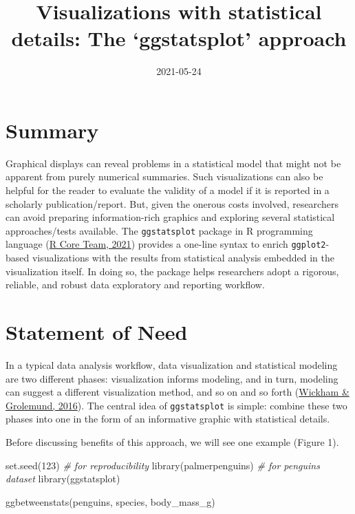 \documentclass[
]{article}
\title{Visualizations with statistical details: The `ggstatsplot'
approach}
\author{}
\date{\vspace{-2.5em}2021-05-24}
\newenvironment{Shaded}{\begin{snugshade}}{\end{snugshade}}
\newcommand{\CommentTok}[1]{\textcolor[rgb]{0.56,0.35,0.01}{\textit{#1}}}
\newcommand{\DecValTok}[1]{\textcolor[rgb]{0.00,0.00,0.81}{#1}}
\newcommand{\FunctionTok}[1]{\textcolor[rgb]{0.00,0.00,0.00}{#1}}
\newcommand{\NormalTok}[1]{#1}
\begin{document}
\maketitle

\hypertarget{summary}{%
\section{Summary}\label{summary}}

Graphical displays can reveal problems in a statistical model that might
not be apparent from purely numerical summaries. Such visualizations can
also be helpful for the reader to evaluate the validity of a model if it
is reported in a scholarly publication/report. But, given the onerous
costs involved, researchers can avoid preparing information-rich
graphics and exploring several statistical approaches/tests available.
The \texttt{ggstatsplot} package in R programming language
(\protect\hyperlink{ref-base2021}{R Core Team, 2021}) provides a
one-line syntax to enrich \texttt{ggplot2}-based visualizations with the
results from statistical analysis embedded in the visualization itself.
In doing so, the package helps researchers adopt a rigorous, reliable,
and robust data exploratory and reporting workflow.

\hypertarget{statement-of-need}{%
\section{Statement of Need}\label{statement-of-need}}

In a typical data analysis workflow, data visualization and statistical
modeling are two different phases: visualization informs modeling, and
in turn, modeling can suggest a different visualization method, and so
on and so forth (\protect\hyperlink{ref-wickham2016r}{Wickham \&
Grolemund, 2016}). The central idea of \texttt{ggstatsplot} is simple:
combine these two phases into one in the form of an informative graphic
with statistical details.

Before discussing benefits of this approach, we will see one example
(Figure 1).

\begin{Shaded}
\begin{Highlighting}[]
\FunctionTok{set.seed}\NormalTok{(}\DecValTok{123}\NormalTok{) }\CommentTok{\# for reproducibility}
\FunctionTok{library}\NormalTok{(palmerpenguins) }\CommentTok{\# for \textquotesingle{}penguins\textquotesingle{} dataset}
\FunctionTok{library}\NormalTok{(ggstatsplot)}

\FunctionTok{ggbetweenstats}\NormalTok{(penguins, species, body\_mass\_g)}
\end{Highlighting}
\end{Shaded}
\end{document}

